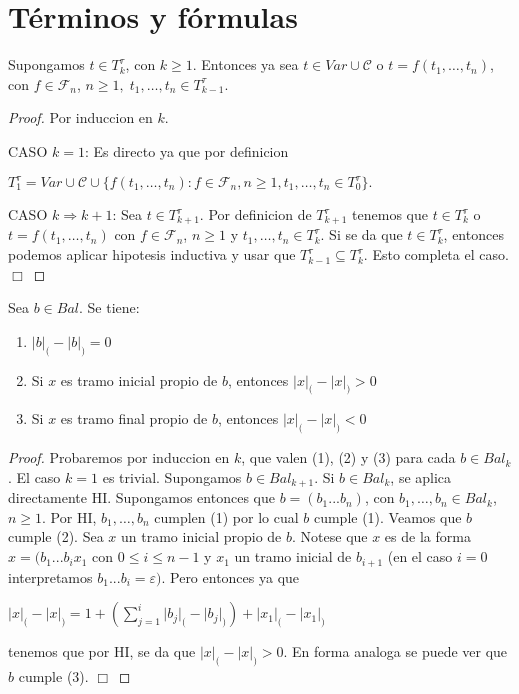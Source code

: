 \section{Términos y fórmulas}

  \begin{lemma}
    Supongamos $t\in T_{k}^{\tau }$, con $k\geq 1$. Entonces ya sea $t\in Var \cup \mathcal{C}$ o $t=f(t_{1}, \dotsc,t_{n})$, con $f\in \mathcal{F }_{n}$, $n\geq 1,\;t_{1}, \dotsc,t_{n}\in T_{k-1}^{\tau }$.
  \end{lemma}
  \begin{proof}
    Por induccion en $k$.

    CASO $k=1$: Es directo ya que por definicion

    $\displaystyle T_{1}^{\tau }=Var \cup \mathcal{C}\cup \{f(t_{1}, \dotsc,t_{n}):f\in \mathcal{F}_{n},n\geq 1,t_{1}, \dotsc,t_{n}\in T_{0}^{\tau }\}. $

    CASO $k\Rightarrow k+1$: Sea $t\in T_{k+1}^{\tau }$. Por definicion de $ T_{k+1}^{\tau }$ tenemos que $t\in T_{k}^{\tau }$ o $t=f(t_{1}, \dotsc,t_{n})$ con $f\in \mathcal{F}_{n}$, $n\geq 1$ y $t_{1}, \dotsc,t_{n}\in T_{k}^{\tau }$. Si se da que $t\in T_{k}^{\tau }$, entonces podemos aplicar hipotesis inductiva y usar que $T_{k-1}^{\tau }\subseteq T_{k}^{\tau }$. Esto completa el caso. $\Box$
  \end{proof}

  \begin{lemma}
    \PN Sea $b \in Bal$. Se tiene:
    \begin{enumerate}[(1)]
      \item $\lvert b\rvert_{(}-\lvert b\rvert_{)}=0$
      \item Si $x$ es tramo inicial propio de $b$, entonces $\lvert x\rvert_{(}-\lvert x\rvert_{)} >0$
      \item Si $x$ es tramo final propio de $b$, entonces $\lvert x\rvert_{(}-\lvert x\rvert_{)}< 0$
    \end{enumerate}
  \end{lemma}
  \begin{proof}
    Probaremos por induccion en $k$, que valen (1), (2) y (3) para cada $b\in Bal_{k}$. El caso $k=1$ es trivial. Supongamos $b\in Bal_{k+1}$. Si $b\in Bal_{k}$, se aplica directamente HI. Supongamos entonces que $ b=(b_{1}...b_{n})$, con $b_{1}, \dotsc,b_{n}\in Bal_{k}$, $n\geq 1$. Por HI, $ b_{1}, \dotsc,b_{n}$ cumplen (1) por lo cual $b$ cumple (1). Veamos que $b$ cumple (2). Sea $x$ un tramo inicial propio de $b$. Notese que $x$ es de la forma $x=(b_{1}...b_{i}x_{1}$ con $0\leq i\leq n-1$ y $x_{1}$ un tramo inicial de $b_{i+1}$ (en el caso $i=0$ interpretamos $b_{1}...b_{i}= \varepsilon )$. Pero entonces ya que

    $\displaystyle \lvert x\rvert_{(}-\lvert x\rvert_{)}=1+\left( \sum_{j=1}^{i}\lvert b_{j}\rvert_{(}-\lvert b_{j}\rvert_{)}\right) +\lvert x_{1}\rvert_{(}-\lvert x_{1}\rvert_{)} $

    tenemos que por HI, se da que $\lvert x\rvert_{(}-\lvert x\rvert_{)} >0$. En forma analoga se puede ver que $b$ cumple (3). $\Box$
  \end{proof}

